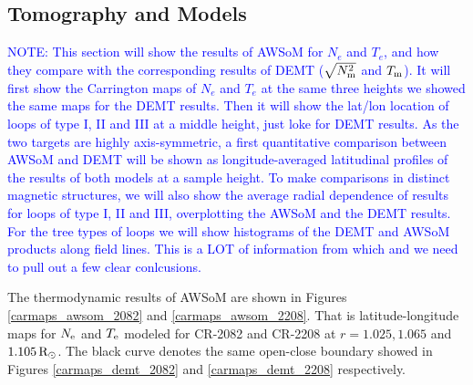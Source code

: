 \documentclass[namedreferences]{solarphysics}
\newcommand{\mrsun}{{\rm R_\odot}}
\newcommand{\Te}{T_{\rm e}}
\newcommand{\Tm}{T_{\rm m}}
\newcommand{\Ne}{N_{\rm e}}
\newcommand{\Nsqm}{N^2_{{\rm m}}}
\newcommand{\sqravgN}{\sqrt{\Nsqm}}
\def\notebyalbert#1{\textcolor{blue}{NOTE: #1}}
\begin{document}
\begin{article}


\subsection{Tomography and Models}\label{awsom_res} 

\noindent\notebyalbert{This section will show the results of AWSoM for $N_e$ and $T_e$, and how they compare with the corresponding results of DEMT ($\sqravgN$ and $\Tm$). It will first show the Carrington maps of $N_e$ and $T_e$ at the same three heights we showed the same maps for the DEMT results. Then it will show the lat/lon location of loops of type I, II and III at a middle height, just loke for DEMT results. As the two targets are highly axis-symmetric, a first quantitative comparison between AWSoM and DEMT will be shown as longitude-averaged latitudinal profiles of the results of both models at a sample height. To make comparisons in distinct magnetic structures, we will also show the average radial dependence of results for loops of type I, II and III, overplotting the AWSoM and the DEMT results. For the tree types of loops we will show histograms of the DEMT and AWSoM products along field lines. This is a LOT of information from which and we need to pull out a few clear conlcusions.}

The thermodynamic results of AWSoM are shown in Figures \ref{carmaps_awsom_2082} and \ref{carmaps_awsom_2208}. That is latitude-longitude maps for $\Ne$ and $\Te$ modeled for CR-2082 and CR-2208 at $r=1.025, 1.065$ and $1.105\,\mrsun$. The black curve denotes the same open-close boundary showed in Figures \ref{carmaps_demt_2082} and \ref{carmaps_demt_2208} respectively.



\end{article}
\end{document}
